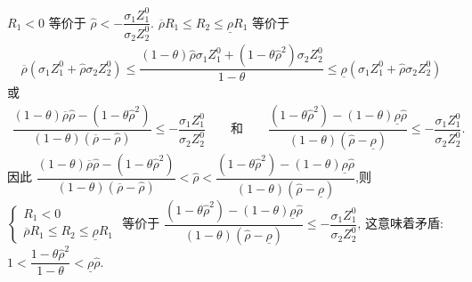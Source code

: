 \documentclass[10.0pt]{article}
\begin{document}
$ R_1 < 0 $ 等价于 $ {\hat \rho} < - \dfrac{\sigma_1 Z_1^0}{\sigma_2 Z_2^0} $.
$ \overline{\rho} R_1 \leqslant R_2 \leqslant \underline{\rho} R_1 $ 等价于 
\begin{eqnarray*}
\overline{\rho} (\sigma_1 Z_1^0 + {\hat \rho} \sigma_2 Z_2^0) \leqslant \dfrac{(1 - \theta) {\hat \rho} \sigma_1 Z_1^0 + (1 - \theta {\hat \rho}^2) \sigma_2 Z_2^0}{1 - \theta} \leqslant \underline{\rho} (\sigma_1 Z_1^0 + {\hat \rho} \sigma_2 Z_2^0)
\end{eqnarray*}
或
\begin{eqnarray*}
\dfrac{(1 - \theta) \overline{\rho} {\hat \rho} - (1 - \theta {\hat \rho}^2)}{(1 - \theta) (\overline{\rho} - {\hat \rho})} \leqslant - \dfrac{\sigma_1 Z_1^0}{\sigma_2 Z_2^0} \qquad \text{和} \qquad \dfrac{(1 - \theta {\hat \rho}^2) - (1 - \theta) \underline{\rho} {\hat \rho}}{(1 - \theta) ({\hat \rho} - \underline{\rho})} \leqslant - \dfrac{\sigma_1 Z_1^0}{\sigma_2 Z_2^0}.
\end{eqnarray*}
因此 $ \dfrac{(1 - \theta) \overline{\rho} {\hat \rho} - (1 - \theta {\hat \rho}^2)}{(1 - \theta) (\overline{\rho} - {\hat \rho})} < {\hat \rho} < \dfrac{(1 - \theta {\hat \rho}^2) - (1 - \theta) \underline{\rho} {\hat \rho}}{(1 - \theta) ({\hat \rho} - \underline{\rho})} $,则 $ \left\{ \begin{matrix} R_1 < 0 \\ \overline{\rho} R_1 \leqslant R_2 \leqslant \underline{\rho} R_1 \end{matrix} \right. $ 等价于 $ \dfrac{(1 - \theta {\hat \rho}^2) - (1 - \theta) \underline{\rho} {\hat \rho}}{(1 - \theta) ({\hat \rho} - \underline{\rho})} \leqslant - \dfrac{\sigma_1 Z_1^0}{\sigma_2 Z_2^0} $, 这意味着矛盾: $ 1 < \dfrac{1 - \theta {\hat \rho}^2}{1 - \theta} < \underline{\rho} {\hat \rho} $.
\end{document}
